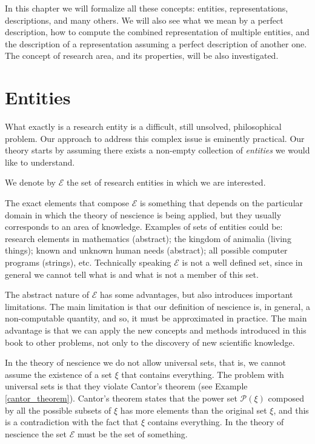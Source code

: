 In this chapter we will formalize all these concepts: entities, representations, descriptions, and many others. We will also see what we mean by a perfect description, how to compute the combined representation of multiple entities, and the description of a representation assuming a perfect description of another one. The concept of research area, and its properties, will be also investigated.

%
%

\section{Entities}
\label{sec:descriptions_entities}

What exactly is a research entity is a difficult, still unsolved, philosophical problem. Our approach to address this complex issue is eminently practical. Our theory starts by assuming there exists a non-empty collection of \emph{entities} we would like to understand.

\begin{notation}
We denote by $\mathcal{E}$ the set of research entities in which we are interested.
\end{notation}

The exact elements that compose $\mathcal{E}$ is something that depends on the particular domain in which the theory of nescience is being applied, but they usually corresponds to an area of knowledge. Examples of sets of entities could be: research elements in mathematics (abstract); the kingdom of animalia (living things); known and unknown human needs (abstract); all possible computer programs (strings), etc. Technically speaking $\mathcal{E}$ is not a well defined set, since in general we cannot tell what is and what is not a member of this set.

The abstract nature of $\mathcal{E}$ has some advantages, but also introduces important limitations. The main limitation is that our definition of nescience is, in general, a non-computable quantity, and so, it must be approximated in practice. The main advantage is that we can apply the new concepts and methods introduced in this book to other problems, not only to the discovery of new scientific knowledge.

In the theory of nescience we do not allow universal sets, that is, we cannot assume the existence of a set $\xi$ that contains everything. The problem with universal sets is that they violate Cantor's theorem (see Example \ref{cantor_theorem}). Cantor's theorem states that the power set $\mathcal{P}(\xi)$ composed by all the possible subsets of $\xi$ has more elements than the original set $\xi$, and this is a contradiction with the fact that $\xi$ contains everything. In the theory of nescience the set $\mathcal{E}$ must be the set of something.

